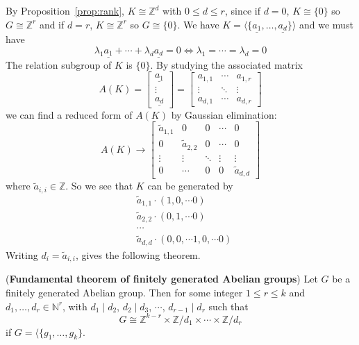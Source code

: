 \begin{example}
	By Proposition~\ref{prop:rank}, $K \cong \mathbb{Z}^d$ with $0 \le d \le r$, since if $d = 0$, $K \cong \{ 0 \}$ so $G \cong \mathbb{Z}^r$ and if $d = r$, $K \cong \mathbb{Z}^r$ so $G \cong \{ 0 \}$. We have $K = \langle \{ \underline{a_1}, \dots, \underline{a_d} \} \rangle$ and we must have
	\[
		\lambda_1 \underline{a_1} + \cdots + \lambda_d \underline{a_d} = 0 \Longleftrightarrow \lambda_1 = \cdots = \lambda_d = 0
	\]
	The relation subgroup of $K$ is $\{ 0 \}$. By studying the associated matrix
	\[
		A(K) = \begin{bmatrix}
			\underline{a_1} \\
			\vdots \\
			\underline{a_d}
		\end{bmatrix} = \begin{bmatrix}
			a_{1, 1} & \cdots & a_{1, r} \\
			\vdots & \ddots & \vdots \\
			a_{d, 1} & \cdots & a_{d, r}
		\end{bmatrix}
	\]
	we can find a reduced form of $A(K)$ by Gaussian elimination:
	\[
		A(K) \to \begin{bmatrix}
			\tilde{a}_{1, 1} & 0 & 0 & \cdots & 0 \\
			0 & \tilde{a}_{2, 2} & 0 & \cdots & 0 \\
			\vdots & \vdots & \ddots & \vdots & \vdots \\
			0 & \cdots & 0 & 0 & \tilde{a}_{d, d}
		\end{bmatrix}
	\]
	where $\tilde{a}_{i, i} \in \mathbb{Z}$. So we see that $K$ can be generated by
	\[
		\begin{aligned}
			& \tilde{a}_{1, 1} \cdot (1, 0, \cdots 0) \\
			& \tilde{a}_{2, 2} \cdot (0, 1, \cdots 0) \\
			& \cdots \\
			& \tilde{a}_{d, d} \cdot (0, 0, \cdots 1, 0, \cdots 0)
		\end{aligned}
	\]
	Writing $d_i = \tilde{a}_{i, i}$, gives the following theorem.
\end{example}

\begin{theorem}
	(\textbf{Fundamental theorem of finitely generated Abelian groups}) Let $G$ be a finitely generated Abelian group. Then for some integer $1 \le r \le k$ and $d_1, \dots, d_r \in \mathbb{N}^r$, with $d_1 \mid d_2$, $d_2 \mid d_3$, $\cdots$, $d_{r - 1} \mid d_r$ such that
	\[
		G \cong \mathbb{Z}^{k - r} \times \mathbb{Z} / d_1 \times \cdots \times \mathbb{Z} / d_r
	\]
	if $G = \langle \{ g_1, \dots, g_k \}$.
\end{theorem}

